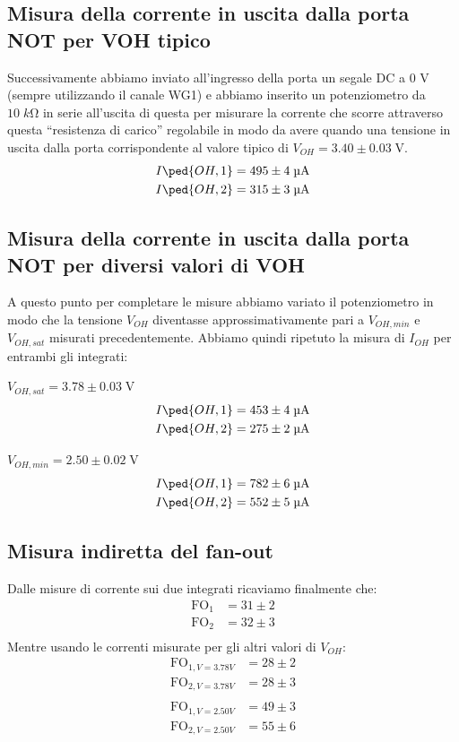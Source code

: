 \documentclass[10pt, a4paper, italian]{article}
\begin{document}
\subsection{Misura della corrente in uscita dalla porta NOT per VOH tipico}
Successivamente abbiamo inviato all'ingresso della porta un segale DC a 0 V
(sempre utilizzando il canale WG1) e abbiamo inserito un potenziometro da
$10 \; \si{k\ohm}$ in serie all'uscita di questa per misurare la corrente che
scorre attraverso questa ``resistenza di carico'' regolabile in modo da
avere quando una tensione in uscita dalla porta corrispondente al valore
tipico di $V_{OH}= 3.40 \pm 0.03 \; \si{\V}$.
\begin{align*}
    I\ped{OH, 1} &= 495 \pm 4 \; \si{\micro\A} \\
    I\ped{OH, 2} &= 315 \pm 3 \; \si{\micro\A} \\   
\end{align*}

\subsection{Misura della corrente in uscita dalla porta NOT per diversi valori di VOH}
A questo punto per completare le misure abbiamo variato il potenziometro in modo che 
la tensione $V_{OH}$ diventasse approssimativamente pari a $V_{OH,min}$ e $V_{OH,sat}$  misurati precedentemente.
Abbiamo quindi ripetuto la misura di $I_{OH}$ per entrambi gli integrati:

$V_{OH,sat}= 3.78 \pm 0.03 \; \si{\V}$
\begin{align*}
    I\ped{OH, 1} &= 453 \pm 4 \; \si{\micro\A} \\
    I\ped{OH, 2} &= 275 \pm 2 \; \si{\micro\A} \\   
\end{align*}

$V_{OH,min}= 2.50 \pm 0.02 \; \si{\V}$
\begin{align*}
    I\ped{OH, 1} &= 782 \pm 6 \; \si{\micro\A} \\
    I\ped{OH, 2} &= 552 \pm 5 \; \si{\micro\A} \\   
\end{align*}

\subsection{Misura indiretta del fan-out}
Dalle misure di corrente sui due integrati ricaviamo finalmente che:
\begin{align*}
    \text{FO}_1 &= 31 \pm 2 \\
    \text{FO}_2 &= 32 \pm 3 \\
\end{align*}
Mentre usando le correnti misurate per gli altri valori di $V_{OH}$:
\begin{align*}
    \text{FO}_{1,V=3.78 V} &= 28 \pm 2 \\
    \text{FO}_{2,V=3.78 V} &= 28 \pm 3 \\
\\
    \text{FO}_{1,V=2.50 V} &= 49 \pm 3 \\
    \text{FO}_{2,V=2.50 V} &= 55 \pm 6\\
\end{align*}
\end{document}
